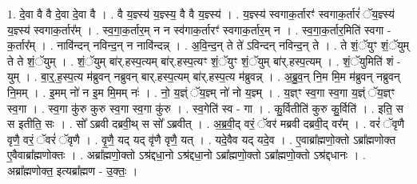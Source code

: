 \documentclass[17pt]{extarticle}
\begin{document}
1. दे॒वा वै वै दे॒वा दे॒वा वै । . वै य॒ज्ञ्स्य॑ य॒ज्ञ्स्य॒ वै वै य॒ज्ञ्स्य॑ । . य॒ज्ञ्स्य॑ स्वगाक॒र्तारꣳ॑ स्वगाक॒र्तारं॑ ॅय॒ज्ञ्स्य॑ य॒ज्ञ्स्य॑ स्वगाक॒र्तार᳚म् । . स्व॒गा॒क॒र्तार॒म् न न स्व॑गाक॒र्तारꣳ॑ स्वगाक॒र्तार॒म् न । . स्व॒गा॒क॒र्तार॒मिति॑ स्वगा - क॒र्तार᳚म् । . नावि॑न्दन् नविन्द॒न् न नावि॑न्दन्न् । . अ॒वि॒न्द॒न् ते ते॑ ऽविन्दन् नविन्द॒न् ते । . ते शं॒ॅयुꣳ शं॒ॅयुम् ते ते शं॒ॅयुम् । . शं॒ॅयुम् बा॑र्.हस्प॒त्यम् बा॑र्.हस्प॒त्यꣳ शं॒ॅयुꣳ शं॒ॅयुम् बा॑र्.हस्प॒त्यम् । . शं॒ॅयुमिति॑ शं - युम् । . बा॒र्॒.ह॒स्प॒त्य म॑ब्रुवन् नब्रुवन् बार्.हस्प॒त्यम् बा॑र्.हस्प॒त्य म॑ब्रुवन्न् । . अ॒ब्रु॒व॒न् नि॒म मि॒म म॑ब्रुवन् नब्रुवन् नि॒मम् । . इ॒मम् नो॑ न इ॒म मि॒मम् नः॑ । . नो॒ य॒ज्ञ्ं ॅय॒ज्ञ्म् नो॑ नो य॒ज्ञ्म् । . य॒ज्ञ्ꣳ स्व॒गा स्व॒गा य॒ज्ञ्ं ॅय॒ज्ञ्ꣳ स्व॒गा । . स्व॒गा कु॑रु कुरु स्व॒गा स्व॒गा कु॑रु । . स्व॒गेति॑ स्व - गा । . कु॒र्वितीति॑ कुरु कु॒र्विति॑ । . इति॒ स स इतीति॒ सः । . सो᳚ ऽब्रवी दब्रवी॒थ् स सो᳚ ऽब्रवीत् । . अ॒ब्र॒वी॒द् वरं॒ ॅवर॑ मब्रवी दब्रवी॒द् वर᳚म् । . वरं॑ ॅवृणै वृणै॒ वरं॒ ॅवरं॑ ॅवृणै । . वृ॒णै॒ यद् यद् वृ॑णै वृणै॒ यत् । . यदे॒वैव यद् यदे॒व । . ए॒वाब्रा᳚ह्मणो॒क्तो ऽब्रा᳚ह्मणोक्त ए॒वैवाब्रा᳚ह्मणोक्तः । . अब्रा᳚ह्मणो॒क्तो ऽश्र॑द्दधा॒नो ऽश्र॑द्दधा॒नो ऽब्रा᳚ह्मणो॒क्तो ऽब्रा᳚ह्मणो॒क्तो ऽश्र॑द्दधानः । . अब्रा᳚ह्मणोक्त॒ इत्यब्रा᳚ह्मण - उ॒क्तः॒ । \newline
\end{document}
